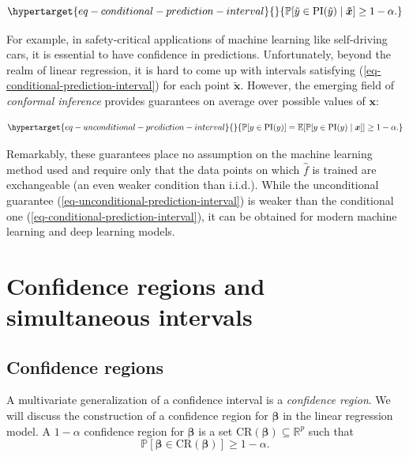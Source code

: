 \documentclass[
  11pt,
  letterpaper,
  oneside]{book}
\theoremstyle{plain}
\theoremstyle{plain}
\theoremstyle{definition}
\theoremstyle{definition}
\theoremstyle{plain}
\theoremstyle{remark}
\begin{document}
\begin{equation}\protect\hypertarget{eq-conditional-prediction-interval}{}{
\mathbb{P}[\tilde y \in \text{PI}(\tilde y) \mid \boldsymbol{\tilde x}] \geq 1-\alpha.
}\label{eq-conditional-prediction-interval}\end{equation}

For example, in safety-critical applications of machine learning like
self-driving cars, it is essential to have confidence in predictions.
Unfortunately, beyond the realm of linear regression, it is hard to come
up with intervals satisfying (\ref{eq-conditional-prediction-interval})
for each point \(\boldsymbol{\tilde x}\). However, the emerging field of
\emph{conformal inference} provides guarantees on average over possible
values of \(\boldsymbol{x}\):

\begin{equation}\protect\hypertarget{eq-unconditional-prediction-interval}{}{
\mathbb{P}[y \in \text{PI}(y)] = \mathbb{E}[\mathbb{P}[y \in \text{PI}(y) \mid \boldsymbol{x}]] \geq 1-\alpha.
}\label{eq-unconditional-prediction-interval}\end{equation}

Remarkably, these guarantees place no assumption on the machine learning
method used and require only that the data points on which
\(\widehat{f}\) is trained are exchangeable (an even weaker condition
than i.i.d.). While the unconditional guarantee
(\ref{eq-unconditional-prediction-interval}) is weaker than the
conditional one (\ref{eq-conditional-prediction-interval}), it can be
obtained for modern machine learning and deep learning models.

\hypertarget{confidence-regions-and-simultaneous-intervals}{%
\section{Confidence regions and simultaneous
intervals}\label{confidence-regions-and-simultaneous-intervals}}

\hypertarget{confidence-regions}{%
\subsection{Confidence regions}\label{confidence-regions}}

A multivariate generalization of a confidence interval is a
\emph{confidence region}. We will discuss the construction of a
confidence region for \(\boldsymbol{\beta}\) in the linear regression
model. A \(1-\alpha\) confidence region for \(\boldsymbol{\beta}\) is a
set \(\text{CR}(\boldsymbol{\beta}) \subseteq \mathbb R^p\) such that \[
\mathbb{P}[\boldsymbol{\beta} \in \text{CR}(\boldsymbol{\beta})] \geq 1-\alpha.
\]
\end{document}
